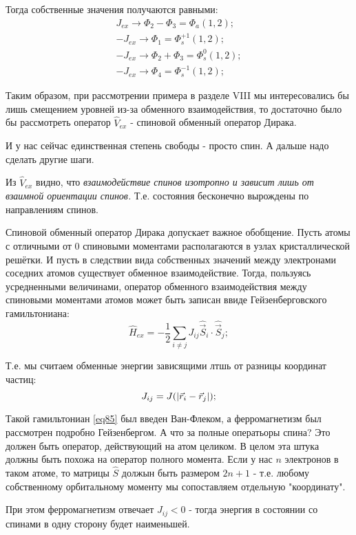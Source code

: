 \documentclass[a4paper, 14pt, russian]{article}
\newcommand{\be}{\begin{equation}}
\newcommand{\ee}{\end{equation}}
\begin{document}
	Тогда собственные значения получаются равными:
	\begin{eqnarray}
		\label{eq84}
		J_{ex} \rightarrow \Phi_2 - \Phi_3 = \Phi_{a}(1,2);\\
		- J_{ex} \rightarrow \Phi_1 = \Phi_{s}^{+1}(1,2);\\
		- J_{ex} \rightarrow \Phi_2 + \Phi_3 = \Phi_{s}^{0}(1,2);\\
		- J_{ex} \rightarrow \Phi_4 = \Phi_{s}^{-1}(1,2);
	\end{eqnarray}

	Таким образом, при рассмотрении примера в разделе VIII мы интересовались бы 
	лишь смещением уровней из-за обменного взаимодействия, то достаточно было
	бы рассмотреть оператор $\hat{V}_{ex}$ - спиновой обменный оператор Дирака.

	И у нас сейчас единственная степень свободы  - просто спин. А дальше надо
	сделать другие шаги.

	Из $\hat{V}_{ex}$ видно, что \textit{взаимодействие спинов изотропно и зависит лишь от 
	взаимной ориентации спинов.} Т.е. состояния бесконечно вырождены по направлениям спинов.

	Спиновой обменный оператор Дирака допускает важное обобщение. Пусть атомы с отличными от 
	0 спиновыми моментами располагаются в узлах кристаллической решётки. И пусть 
	в следствии вида собственных значений между электронами соседних атомов существует 
	обменное взаимодействие. Тогда, пользуясь усредненными величинами, оператор 
	обменного взаимодействия между спиновыми моментами атомов может быть записан ввиде
	Гейзенберговского гамильтониана:
	\be
		\label{eq85}
		\hat{H}_{ex} = - \frac{1}{2} \sum_{i\neq j} J_{ij} \hat{\vec S}_i \cdot \hat{\vec S}_j;
	\ee

	Т.е. мы считаем обменные энергии зависящими лтшь от разницы координат частиц:
	\be
		J_{ij} = J(\abs{\vec{r}_i - \vec{r}_j});
	\ee

	Такой гамильтониан \ref{eq85} был введен Ван-Флеком, а ферромагнетизм был рассмотрен
	подробно Гейзенбергом. А что за полные оператьоры спина? Это должен быть
	оператор, действующий на атом целиком. В целом эта штука должны быть похожа
	на оператор полного момента. Если у нас $n$ электронов в таком атоме, то 
	матрицы $\hat S$ должын быть размером $2 n + 1$ - т.е. любому собственному орбитальному
	моменту мы сопоставляем отдельную "координату".

	При этом ферромагнетизм отвечает $J_{ij} < 0$ - тогда энергия в состоянии со спинами в 
	одну сторону будет наименьшей.
\end{document}
